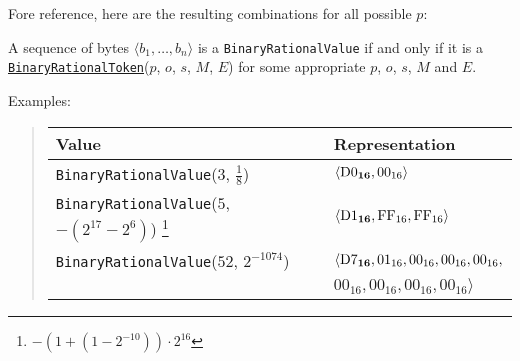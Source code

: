 \documentclass[headings=normal, headsepline, numbers=noenddot, fleqn, a4paper]{scrartcl}
\newcommand{\HexNumber}[1]{\mathrm{#1}_{16}}
\newcommand{\DborSyntaxIdent}[1]{\texttt{#1}}
\newcommand{\DborSyntaxIdentRef}[1]{\hyperlink{sec:def:#1}{\DborSyntaxIdent{#1}}}
\newcommand{\DborFirstByte}[2]{\mathbf{\textcolor{#1}{\HexNumber{#2}}}}
\newcommand{\DborFirstByteNumber}[1]{\DborFirstByte{black}{#1}}
\newcommand{\DborNextByte}[1]{\HexNumber{#1}}
\begin{document}
    \smallskip
    \noindent
    Fore reference, here are the resulting combinations for all possible $p$:
    \nolinebreak
    \begin{quote}
    \end{quote}

    A sequence of bytes $\langle b_1, \ldots, b_n\rangle$ is a \DborSyntaxIdent{BinaryRationalValue} if and only if
    it is a \DborSyntaxIdentRef{BinaryRationalToken}($p$, $o$, $s$, $M$, $E$) for some
    appropriate $p$, $o$, $s$, $M$ and $E$.

    \smallskip
    \noindent
    Examples:
    \nolinebreak
    \begin{quote}    
        \begin{tabular}{ll}
            \toprule
            Value & Representation \\
            \midrule
            \DborSyntaxIdent{BinaryRationalValue}($3$, $\frac{1}{8}$) 
                &  $\langle \DborFirstByteNumber{D0}, \DborNextByte{00} \rangle$ \\
            \DborSyntaxIdent{BinaryRationalValue}($5$, $-(2^{17} - 2^6)$)%
                \footnote{$-\left(1 + (1 - 2^{-10})\right) \cdot 2^{16}$}
                &  $\langle \DborFirstByteNumber{D1}, \DborNextByte{FF}, \DborNextByte{FF} \rangle$ \\
            \DborSyntaxIdent{BinaryRationalValue}($52$, $2^{-1074}$) 
                &  $\langle \DborFirstByteNumber{D7}, \DborNextByte{01}, \DborNextByte{00},
                                                      \DborNextByte{00}, \DborNextByte{00},$ \\
                &  $                                  \DborNextByte{00}, \DborNextByte{00},
                                                      \DborNextByte{00}, \DborNextByte{00} \rangle$ \\
            \bottomrule
        \end{tabular}
    \end{quote}
\end{document}
